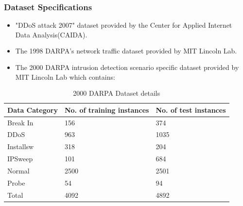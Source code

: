 \documentclass[10pt]{beamer}
\begin{document}
\begin{frame}
\frametitle{Dataset Specifications}
\begin{itemize}
\footnotesize
\item
"DDoS attack 2007" dataset provided by the Center for Applied Internet Data Analysis(CAIDA).
\item
The 1998 DARPA's network traffic dataset provided by MIT Lincoln Lab.
\item
The 2000 DARPA intrusion detection scenario specific dataset provided by MIT Lincoln Lab which contains:
\end{itemize}

\begin{table}
\scriptsize
\begin{center}
\begin{tabular}{ | m{2cm} | m{2cm}| m{2cm} |} 
\hline
\textbf{Data Category} & \textbf{No. of training instances} & \textbf{No. of test instances} \\
\hline
Break In &
156 &
374 \\
\hline
DDoS &
963 &
1035 \\
\hline
Installsw &
318 &
204 \\
\hline
IPSweep &
101 &
684 \\
\hline
Normal &
2500 &
2501 \\
\hline
Probe &
54 &
94 \\
\hline
Total &
4092 &
4892 \\
\hline
\end{tabular}
\end{center}
\caption{\footnotesize 2000 DARPA Dataset details}
\end{table}
\end{frame}
\end{document}
